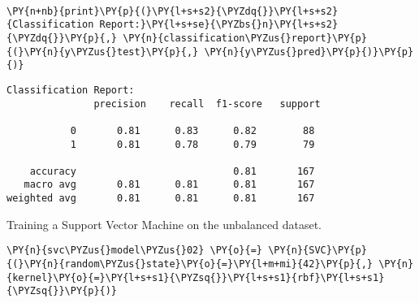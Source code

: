     \begin{center}
    \end{center}
    { \hspace*{\fill} \\}
    
    \begin{tcolorbox}[breakable, size=fbox, boxrule=1pt, pad at break*=1mm,colback=cellbackground, colframe=cellborder]
\begin{Verbatim}[commandchars=\\\{\}]
\PY{n+nb}{print}\PY{p}{(}\PY{l+s+s2}{\PYZdq{}}\PY{l+s+s2}{Classification Report:}\PY{l+s+se}{\PYZbs{}n}\PY{l+s+s2}{\PYZdq{}}\PY{p}{,} \PY{n}{classification\PYZus{}report}\PY{p}{(}\PY{n}{y\PYZus{}test}\PY{p}{,} \PY{n}{y\PYZus{}pred}\PY{p}{)}\PY{p}{)}
\end{Verbatim}
\end{tcolorbox}

    \begin{Verbatim}[commandchars=\\\{\}]
Classification Report:
               precision    recall  f1-score   support

           0       0.81      0.83      0.82        88
           1       0.81      0.78      0.79        79

    accuracy                           0.81       167
   macro avg       0.81      0.81      0.81       167
weighted avg       0.81      0.81      0.81       167

    \end{Verbatim}

    Training a Support Vector Machine on the unbalanced dataset.

    \begin{tcolorbox}[breakable, size=fbox, boxrule=1pt, pad at break*=1mm,colback=cellbackground, colframe=cellborder]
\begin{Verbatim}[commandchars=\\\{\}]
\PY{n}{svc\PYZus{}model\PYZus{}02} \PY{o}{=} \PY{n}{SVC}\PY{p}{(}\PY{n}{random\PYZus{}state}\PY{o}{=}\PY{l+m+mi}{42}\PY{p}{,} \PY{n}{kernel}\PY{o}{=}\PY{l+s+s1}{\PYZsq{}}\PY{l+s+s1}{rbf}\PY{l+s+s1}{\PYZsq{}}\PY{p}{)}
\end{Verbatim}
\end{tcolorbox}

